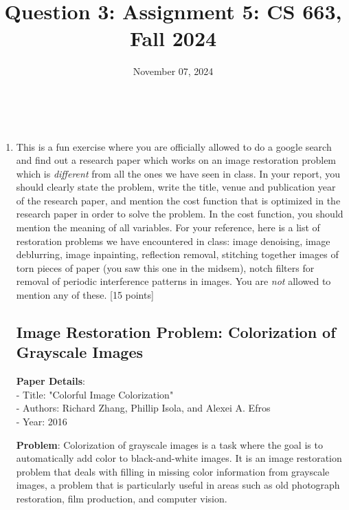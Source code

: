 \documentclass{article}
\title{Question 3: Assignment 5: CS 663, Fall 2024}
\author{
\IEEEauthorblockN{
    \begin{tabular}{cccc}
        \begin{minipage}[t]{0.23\textwidth}
            \centering
            Amitesh Shekhar\\
            IIT Bombay\\
            22b0014@iitb.ac.in
        \end{minipage} & 
        \begin{minipage}[t]{0.23\textwidth}
            \centering
            Anupam Rawat\\
            IIT Bombay\\
            22b3982@iitb.ac.in
        \end{minipage} & 
        \begin{minipage}[t]{0.23\textwidth}
            \centering
            Toshan Achintya Golla\\
            IIT Bombay\\
            22b2234@iitb.ac.in
        \end{minipage} \\
        \\ 
    \end{tabular}
}
}
\date{November 07, 2024}
\begin{document}
\maketitle

\\

\begin{enumerate}
\item 
This is a fun exercise where you are officially allowed to do a google search and find out a research paper which works on an image restoration problem which is \emph{different} from all the ones we have seen in class. In your report, you should clearly state the problem, write the title, venue and publication year of the research paper, and mention the cost function that is optimized in the research paper in order to solve the problem. In the cost function, you should mention the meaning of all variables. For your reference, here is a list of restoration problems we have encountered in class: image denoising, image deblurring, image inpainting, reflection removal, stitching together images of torn pieces of paper (you saw this one in the midsem), notch filters for removal of periodic interference patterns in images. You are \emph{not} allowed to mention any of these. \textsf{[15 points]}

\subsection*{Image Restoration Problem: Colorization of Grayscale Images}

\textbf{Paper Details}:\\
- Title: "Colorful Image Colorization"\\
- Authors: Richard Zhang, Phillip Isola, and Alexei A. Efros\\
- Year: 2016

\textbf{Problem}: Colorization of grayscale images is a task where the goal is to automatically add color to black-and-white images. It is an image restoration problem that deals with filling in missing color information from grayscale images, a problem that is particularly useful in areas such as old photograph restoration, film production, and computer vision.


\end{enumerate}
\end{document}
